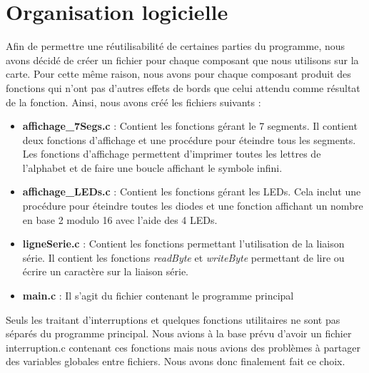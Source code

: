 \documentclass[a4paper, 10pt]{article}
\begin{document}
\section{Organisation logicielle}

Afin de permettre une réutilisabilité de certaines parties du programme, nous avons décidé de créer un fichier pour chaque composant que nous utilisons sur la carte. Pour cette même raison, nous avons pour chaque composant produit des fonctions qui n'ont pas d'autres effets de bords que celui attendu comme résultat de la fonction. Ainsi, nous avons créé les fichiers suivants :
\newline
\begin{itemize}

	\item {\bfseries affichage\_7Segs.c} : Contient les fonctions gérant le 7 segments. Il contient deux fonctions d'affichage et une procédure pour éteindre tous les segments. Les fonctions d'affichage permettent d'imprimer toutes les lettres de l'alphabet et de faire une boucle affichant le symbole infini.
	\newline
	\item {\bfseries affichage\_LEDs.c} : Contient les fonctions gérant les LEDs. Cela inclut une procédure pour éteindre toutes les diodes et une fonction affichant un nombre en base 2 modulo 16 avec l'aide des 4 LEDs.
	\newline
	\item {\bfseries ligneSerie.c} : Contient les fonctions permettant l'utilisation de la liaison série. Il contient les fonctions \textit{readByte} et \textit{writeByte} permettant de lire ou écrire un caractère sur la liaison série.
	\newline
	\item {\bfseries main.c} : Il s'agit du fichier contenant le programme principal
\end{itemize}

\vspace{.8em}

Seuls les traitant d'interruptions et quelques fonctions utilitaires ne sont pas séparés du programme principal. Nous avions à la base prévu d'avoir un fichier interruption.c contenant ces fonctions mais nous avions des problèmes à partager des variables globales entre fichiers. Nous avons donc finalement fait ce choix.
\end{document}
